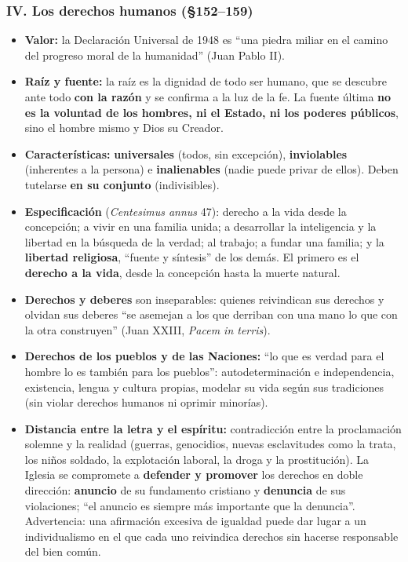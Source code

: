 \documentclass[10pt,a4paper]{article}
\begin{document}
\subsubsection{IV. Los derechos humanos (\S{}152--159)}
\begin{itemize}
\item \textbf{Valor:} la Declaración Universal de 1948 es ``una piedra miliar en el camino del progreso moral de la humanidad'' (Juan Pablo II).
\item \textbf{Raíz y fuente:} la raíz es la dignidad de todo ser humano, que se descubre ante todo \textbf{con la razón} y se confirma a la luz de la fe. La fuente última \textbf{no es la voluntad de los hombres, ni el Estado, ni los poderes públicos}, sino el hombre mismo y Dios su Creador.
\item \textbf{Características:} \textbf{universales} (todos, sin excepción), \textbf{inviolables} (inherentes a la persona) e \textbf{inalienables} (nadie puede privar de ellos). Deben tutelarse \textbf{en su conjunto} (indivisibles).
\item \textbf{Especificación} (\textit{Centesimus annus} 47): derecho a la vida desde la concepción; a vivir en una familia unida; a desarrollar la inteligencia y la libertad en la búsqueda de la verdad; al trabajo; a fundar una familia; y la \textbf{libertad religiosa}, ``fuente y síntesis'' de los demás. El primero es el \textbf{derecho a la vida}, desde la concepción hasta la muerte natural.
\item \textbf{Derechos y deberes} son inseparables: quienes reivindican sus derechos y olvidan sus deberes ``se asemejan a los que derriban con una mano lo que con la otra construyen'' (Juan XXIII, \textit{Pacem in terris}).
\item \textbf{Derechos de los pueblos y de las Naciones:} ``lo que es verdad para el hombre lo es también para los pueblos'': autodeterminación e independencia, existencia, lengua y cultura propias, modelar su vida según sus tradiciones (sin violar derechos humanos ni oprimir minorías).
\item \textbf{Distancia entre la letra y el espíritu:} contradicción entre la proclamación solemne y la realidad (guerras, genocidios, nuevas esclavitudes como la trata, los niños soldado, la explotación laboral, la droga y la prostitución). La Iglesia se compromete a \textbf{defender y promover} los derechos en doble dirección: \textbf{anuncio} de su fundamento cristiano y \textbf{denuncia} de sus violaciones; ``el anuncio es siempre más importante que la denuncia''. Advertencia: una afirmación excesiva de igualdad puede dar lugar a un individualismo en el que cada uno reivindica derechos sin hacerse responsable del bien común.
\end{itemize}
\end{document}
